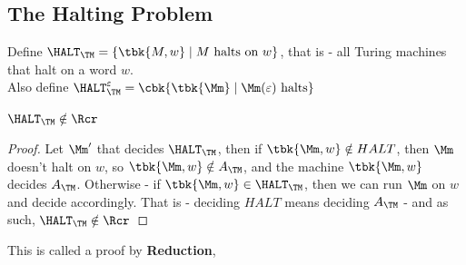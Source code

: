 \subsection{The Halting Problem}
\begin{yellowBox}
	\begin{defn}
		Define $\HALT_{\TM} = \{\tbk{M,w}\mid M\text{ halts on }w\}$, that is - all Turing machines that halt on a word $w$.\\ Also define $\HALT_{\TM}^\varepsilon = \cbk{\tbk{\Mm}\mid \Mm(\varepsilon)\text{ halts}}$
	\end{defn}
\end{yellowBox}
\begin{blueBox}
	\begin{thm}
		$\HALT_{\TM}\notin \Rcr$
	\end{thm}
\end{blueBox}
\begin{proof}
	Let $\Mm'$ that decides $\HALT_{\TM}$, then if $\tbk{\Mm,w}\notin HALT$, then $\Mm$  doesn't halt on $w$, so $\tbk{\Mm,w}\notin A_{\TM}$, and the machine $\tbk{\Mm,w}$ decides $A_{\TM}$. Otherwise - if $\tbk{\Mm,w}\in \HALT_{\TM}$, then we can run $\Mm$ on $w$ and decide accordingly. That is - deciding $HALT$ means deciding $A_{\TM}$ - and as such,  $\HALT_{\TM}\notin \Rcr$
\end{proof}
This is called a proof by \textbf{Reduction}, 
